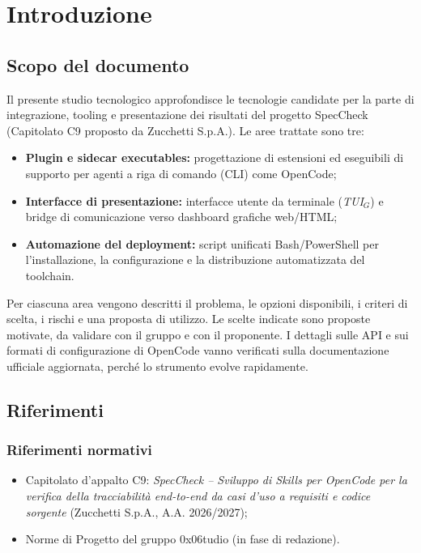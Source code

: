 \documentclass[a4paper, 11pt]{article}
\newcommand{\term}[1]{\textit{#1}$_G$} %
\begin{document}
\newpage
\tableofcontents
\newpage

\section{Introduzione}

\subsection{Scopo del documento}
Il presente studio tecnologico approfondisce le tecnologie candidate per la parte di integrazione, tooling e presentazione dei risultati del progetto SpecCheck (Capitolato C9 proposto da Zucchetti S.p.A.). Le aree trattate sono tre:
\begin{itemize}[noitemsep]
    \item \textbf{Plugin e sidecar executables:} progettazione di estensioni ed eseguibili di supporto per agenti a riga di comando (CLI) come OpenCode;
    \item \textbf{Interfacce di presentazione:} interfacce utente da terminale (\term{TUI}) e bridge di comunicazione verso dashboard grafiche web/HTML;
    \item \textbf{Automazione del deployment:} script unificati Bash/PowerShell per l'installazione, la configurazione e la distribuzione automatizzata del toolchain.
\end{itemize}
Per ciascuna area vengono descritti il problema, le opzioni disponibili, i criteri di scelta, i rischi e una proposta di utilizzo. Le scelte indicate sono proposte motivate, da validare con il gruppo e con il proponente. I dettagli sulle API e sui formati di configurazione di OpenCode vanno verificati sulla documentazione ufficiale aggiornata, perché lo strumento evolve rapidamente.

\subsection{Riferimenti}
\subsubsection{Riferimenti normativi}
\begin{itemize}[noitemsep]
    \item Capitolato d'appalto C9: \textit{SpecCheck -- Sviluppo di Skills per OpenCode per la verifica della tracciabilità end-to-end da casi d'uso a requisiti e codice sorgente} (Zucchetti S.p.A., A.A. 2026/2027);
    \item Norme di Progetto del gruppo 0x06tudio (in fase di redazione).
\end{itemize}
\end{document}
